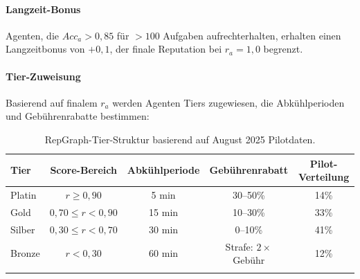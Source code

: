\documentclass[11pt]{article}
\begin{document}
\paragraph{Langzeit-Bonus} Agenten, die $Acc_a > 0,85$ für $>100$ Aufgaben aufrechterhalten, erhalten einen Langzeitbonus von $+0,1$, der finale Reputation bei $r_a = 1,0$ begrenzt.

\paragraph{Tier-Zuweisung} Basierend auf finalem $r_a$ werden Agenten Tiers zugewiesen, die Abkühlperioden und Gebührenrabatte bestimmen:
\begin{longtable}{@{}lcccc@{}}
\toprule
\textbf{Tier} & \textbf{Score-Bereich} & \textbf{Abkühlperiode} & \textbf{Gebührenrabatt} & \textbf{Pilot-Verteilung} \\\midrule
Platin & $r \geq 0,90$ & 5 min & 30--50\% & 14\% \\
Gold & $0,70 \leq r < 0,90$ & 15 min & 10--30\% & 33\% \\
Silber & $0,30 \leq r < 0,70$ & 30 min & 0--10\% & 41\% \\
Bronze & $r < 0,30$ & 60 min & Strafe: $2 \times$ Gebühr & 12\% \\\bottomrule
\caption{RepGraph-Tier-Struktur basierend auf August 2025 Pilotdaten.}
\label{tab:reputation-tiers}
\end{longtable}
\end{document}
